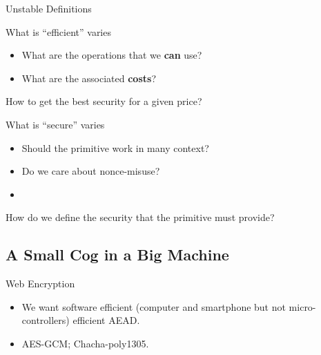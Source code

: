 \documentclass[presentation,aspectratio=1610]{beamer}
\begin{document}
\begin{frame}{Unstable Definitions}
  \begin{alertblock}{What is ``efficient'' varies}
    \begin{itemize}
    \item What are the operations that we \textbf{can} use?
    \item What are the associated \textbf{costs}? 
    \end{itemize}
    \begin{center}
      How to get the best security for a given price?
    \end{center}
  \end{alertblock}

  
  
  \begin{exampleblock}{What is ``secure'' varies}
    \begin{itemize}
    \item Should the primitive work in many context? \hfill{}
    \item Do we care about nonce-misuse? \hfill{}
    \item
    \end{itemize}
    \begin{center}
      How do we define the security that the primitive must provide?
    \end{center}
  \end{exampleblock}
\end{frame}


\subsection{A Small Cog in a Big Machine}


\begin{frame}{Web Encryption}
  \begin{center}

    \begin{itemize}
    \item<6-> We want \alert{software efficient} (computer and smartphone but not micro-controllers) efficient \alert{AEAD}.
    \item<7> AES-GCM; Chacha-poly1305.
    \end{itemize}
  \end{center}
\end{frame}
\end{document}

